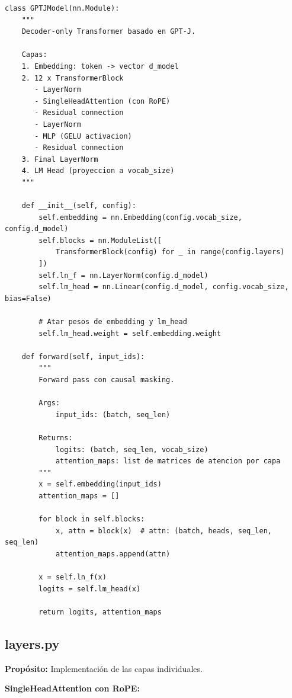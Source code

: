 \documentclass[12pt,a4paper]{report}
\begin{document}
\begin{lstlisting}
class GPTJModel(nn.Module):
    """
    Decoder-only Transformer basado en GPT-J.
    
    Capas:
    1. Embedding: token -> vector d_model
    2. 12 x TransformerBlock
       - LayerNorm
       - SingleHeadAttention (con RoPE)
       - Residual connection
       - LayerNorm
       - MLP (GELU activacion)
       - Residual connection
    3. Final LayerNorm
    4. LM Head (proyeccion a vocab_size)
    """
    
    def __init__(self, config):
        self.embedding = nn.Embedding(config.vocab_size, config.d_model)
        self.blocks = nn.ModuleList([
            TransformerBlock(config) for _ in range(config.layers)
        ])
        self.ln_f = nn.LayerNorm(config.d_model)
        self.lm_head = nn.Linear(config.d_model, config.vocab_size, bias=False)

        # Atar pesos de embedding y lm_head
        self.lm_head.weight = self.embedding.weight
    
    def forward(self, input_ids):
        """
        Forward pass con causal masking.
        
        Args:
            input_ids: (batch, seq_len)
        
        Returns:
            logits: (batch, seq_len, vocab_size)
            attention_maps: list de matrices de atencion por capa
        """
        x = self.embedding(input_ids)
        attention_maps = []

        for block in self.blocks:
            x, attn = block(x)  # attn: (batch, heads, seq_len, seq_len)
            attention_maps.append(attn)

        x = self.ln_f(x)
        logits = self.lm_head(x)

        return logits, attention_maps
\end{lstlisting}

\subsection{layers.py}
\label{subsec:layers}

\textbf{Propósito:} Implementación de las capas individuales.

\textbf{SingleHeadAttention con RoPE:}
\end{document}
